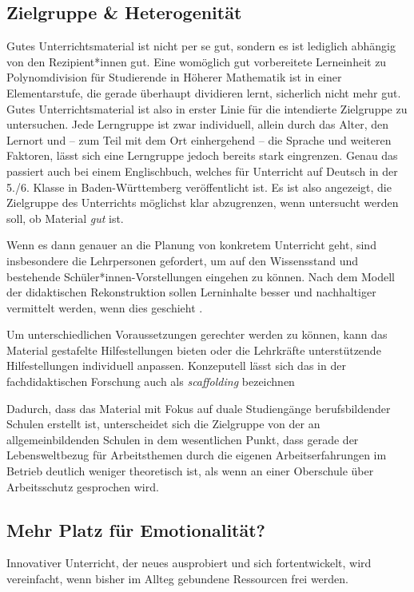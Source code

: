\subsection{Zielgruppe \& Heterogenität \label{Zielgruppe}}
Gutes Unterrichtsmaterial ist nicht per se gut, sondern es ist lediglich abhängig von den Rezipient*innen gut. Eine womöglich gut vorbereitete Lerneinheit zu Polynomdivision für Studierende in Höherer Mathematik ist in einer Elementarstufe, die gerade überhaupt dividieren lernt, sicherlich nicht mehr gut. Gutes Unterrichtsmaterial ist also in erster Linie für die intendierte Zielgruppe zu untersuchen. Jede Lerngruppe ist zwar individuell, allein durch das Alter, den Lernort und -- zum Teil  mit dem Ort einhergehend -- die Sprache und weiteren Faktoren, lässt sich eine Lerngruppe jedoch bereits stark eingrenzen. Genau das passiert auch bei einem Englischbuch, welches für Unterricht auf Deutsch in der 5./6. Klasse in Baden-Württemberg veröffentlicht ist. 
Es ist also angezeigt, die Zielgruppe des Unterrichts möglichst klar abzugrenzen, wenn untersucht werden soll, ob Material \emph{gut} ist. 

Wenn es dann genauer an die Planung von konkretem Unterricht geht, sind insbesondere die Lehrpersonen gefordert, um auf den Wissensstand und bestehende Schüler*innen-Vorstellungen eingehen zu können. Nach dem Modell der didaktischen Rekonstruktion sollen Lerninhalte besser und nachhaltiger vermittelt werden, wenn dies geschieht \autocite[404-406]{Reinfried2009}.

Um unterschiedlichen Voraussetzungen gerechter werden zu können, kann das Material gestafelte Hilfestellungen bieten oder die Lehrkräfte unterstützende Hilfestellungen individuell anpassen. Konzeputell lässt sich das in der fachdidaktischen Forschung auch als \emph{scaffolding} bezeichnen \autocites[Zur historischen Entwicklung des Begriffs \gls{vgl}][]{Shvarts.2019}[Eine Betrachtung von scaffolding für Englisch als Zweitsprache zeigten \gls{zb}][]{Hammond2005}


Dadurch, dass das Material mit Fokus auf duale Studiengänge berufsbildender Schulen erstellt ist, unterscheidet sich die Zielgruppe von der an allgemeinbildenden Schulen in dem wesentlichen Punkt, dass gerade der Lebensweltbezug für Arbeitsthemen durch die eigenen Arbeitserfahrungen im Betrieb deutlich weniger theoretisch ist, als wenn an einer Oberschule über Arbeitsschutz gesprochen wird. 



\subsection{Mehr Platz für Emotionalität? \label{Emotionen}}
Innovativer Unterricht, der neues ausprobiert und sich fortentwickelt, wird vereinfacht, wenn bisher im Allteg gebundene Ressourcen frei werden. 
\bigskip

